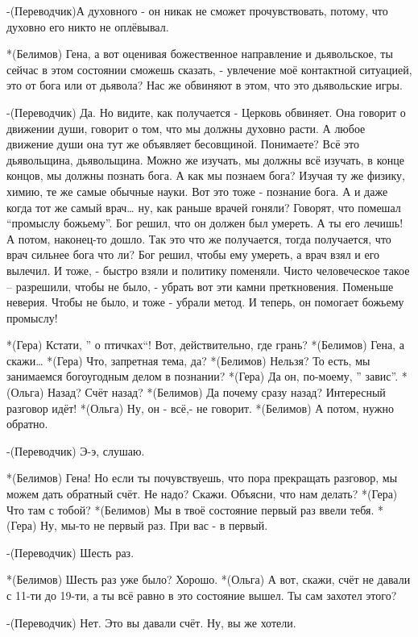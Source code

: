 -(Переводчик)А духовного - он никак не сможет прочувствовать, потому, что духовно  его никто не оплёвывал. 

*(Белимов) Гена, а вот оценивая божественное направление и дьявольское, ты сейчас в этом состоянии сможешь сказать, - увлечение моё контактной ситуацией, это от бога или от дьявола? Нас же обвиняют в этом, что это дьявольские игры.

-(Переводчик) Да. Но видите, как получается -  Церковь обвиняет. Она говорит о движении души, говорит о том, что мы должны духовно расти. А любое движение души она тут же  объявляет бесовщиной. Понимаете? Всё это дьявольщина, дьявольщина. Можно же изучать, мы должны всё изучать, в конце концов, мы должны познать бога. А как мы познаем бога? Изучая ту же физику, химию, те же самые обычные науки. Вот это тоже - познание бога. А и даже когда тот же самый врач… ну, как раньше врачей гоняли? Говорят, что помешал “промыслу божьему”. Бог решил, что он должен был умереть. А ты его лечишь! А потом, наконец-то дошло. Так это что же получается, тогда получается, что врач сильнее бога что ли? Бог решил, чтобы ему умереть, а врач взял и его вылечил. И тоже, - быстро взяли и политику поменяли. Чисто человеческое такое – разрешили, чтобы не было, - убрать вот эти камни преткновения. Поменьше неверия. Чтобы не было, и тоже - убрали метод. И теперь, он помогает божьему промыслу!

*(Гера) Кстати, ” о птичках“!  Вот, действительно, где грань? 
*(Белимов) Гена, а скажи…
*(Гера) Что, запретная тема, да?
*(Белимов) Нельзя? То есть, мы занимаемся богоугодным делом в познании?
*(Гера) Да он, по-моему, ” завис”.
*(Ольга) Назад? Счёт назад?
*(Белимов) Да почему сразу назад? Интересный разговор идёт!
*(Ольга) Ну, он  - всё,- не говорит.
*(Белимов) А потом, нужно обратно.

-(Переводчик) Э-э, слушаю.

*(Белимов) Гена! Но если ты почувствуешь, что пора прекращать разговор, мы можем дать обратный счёт. Не надо? Скажи.  Объясни, что нам делать?
*(Гера) Что там с тобой?
*(Белимов) Мы в твоё состояние первый раз ввели тебя.
*(Гера) Ну, мы-то не первый раз. При вас - в первый.

-(Переводчик) Шесть раз.

*(Белимов) Шесть раз уже было? Хорошо.
*(Ольга) А вот, скажи, счёт не давали с 11-ти до 19-ти, а ты всё равно в это состояние вышел. Ты сам захотел этого?

-(Переводчик) Нет. Это вы давали счёт. Ну, вы же хотели.

